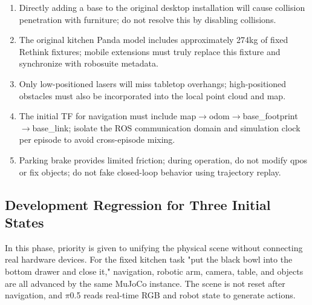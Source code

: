 \begin{enumerate}
\def\labelenumi{\arabic{enumi}.}
\tightlist
\item
  Directly adding a base to the original desktop installation will cause collision penetration with furniture; do not resolve this by disabling collisions.
\item
  The original kitchen Panda model includes approximately 274kg of fixed Rethink fixtures; mobile extensions must truly replace this fixture and synchronize with robosuite metadata.
\item
  Only low-positioned lasers will miss tabletop overhangs; high-positioned obstacles must also be incorporated into the local point cloud and map.
\item
  The initial TF for navigation must include map\(\rightarrow\)odom\(\rightarrow\)base\_footprint\(\rightarrow\)base\_link; isolate the ROS communication domain and simulation clock per episode to avoid cross-episode mixing.
\item
  Parking brake provides limited friction; during operation, do not modify qpos or fix objects; do not fake closed-loop behavior using trajectory replay.
\end{enumerate}


\subsection{Development Regression for Three Initial States}\label{s15-detail-3}

In this phase, priority is given to unifying the physical scene without connecting real hardware devices. For the fixed kitchen task "put the black bowl into the bottom drawer and close it," navigation, robotic arm, camera, table, and objects are all advanced by the same MuJoCo instance. The scene is not reset after navigation, and \(\pi\)0.5 reads real-time RGB and robot state to generate actions.

